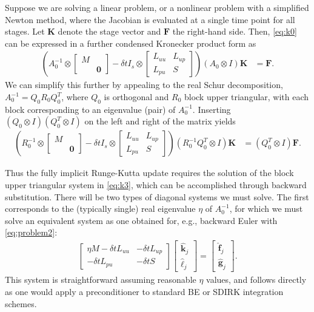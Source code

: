 \documentclass[a4paper,10pt]{article}
\begin{document}
Suppose we are solving a linear problem, or a nonlinear problem with a simplified
Newton method, where the Jacobian is evaluated at a single time point for all
stages. Let $\mathbf{K}$ denote the stage vector and $\mathbf{F}$ the right-hand
side. Then, \eqref{eq:k0} can be expressed in a further condensed Kronecker
product form as
%
\begin{align}\label{eq:k2}
\left(A_0^{-1} \otimes \begin{bmatrix} M \\ & \mathbf{0}\end{bmatrix}
	- \delta t I_s \otimes \begin{bmatrix} L_{uu} & L_{up} \\ L_{pu} & S \end{bmatrix} \right)
	(A_0\otimes I)\mathbf{K} & = \mathbf{F}.
\end{align}
%
We can simplify this further by appealing to the real Schur decomposition,
$A_0^{-1} = Q_0R_0Q_0^T$, where $Q_0$ is orthogonal and $R_0$ block upper
triangular, with each block corresponding to an eigenvalue (pair) of $A_0^{-1}$.
Inserting $(Q_0\otimes I)(Q_0^T\otimes I)$ on the left and right of the
matrix yields
%
\begin{align}\label{eq:k3}
\left(R_0^{-1} \otimes \begin{bmatrix} M \\ & \mathbf{0}\end{bmatrix}
	- \delta t I_s \otimes \begin{bmatrix} L_{uu} & L_{up} \\ L_{pu} & S \end{bmatrix} \right)
	(R_0^{-1}Q_0^T\otimes I)\mathbf{K} & = (Q_0^T\otimes I)\mathbf{F}.
\end{align}
%

Thus the fully implicit Runge-Kutta update requires the solution of the
block upper triangular system in \eqref{eq:k3}, which can be accomplished
through backward substitution. There will be two types of diagonal systems
we must solve. The first corresponds to the (typically single) real eigenvalue
$\eta$ of $A_0^{-1}$, for which we must solve an equivalent system as one
obtained for, e.g., backward Euler with \eqref{eq:problem2}:
%
\begin{align}\label{eq:R1}
\begin{bmatrix} \eta M - \delta tL_{uu} & -\delta tL_{up} \\ -\delta tL_{pu} & -\delta tS
	\end{bmatrix}
	\begin{bmatrix} \hat{\mathbf{k}}_j \\ \hat{\ell}_j\end{bmatrix} =
	\begin{bmatrix} \hat{\mathbf{f}}_j \\ \hat{\mathbf{g}}_j \end{bmatrix}.
\end{align}
%
This system is straightforward assuming reasonable $\eta$ values, and
follows directly as one would apply a preconditioner to standard BE or
SDIRK integration schemes.
\end{document}
